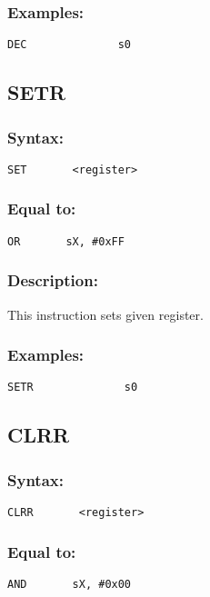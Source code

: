         \subsubsection{Examples:}
            {
                \usecodefont
                \verb'DEC              s0'\\
            }

    \subsection{SETR}
        \subsubsection{Syntax:}
            {
                \usecodefont
                \verb'SET       <register>'
            }

        \subsubsection{Equal to:}
            {
                \usecodefont
                \verb'OR       sX, #0xFF'
            }

        \subsubsection{Description:}
            This instruction sets given register.

        \subsubsection{Examples:}
            {
                \usecodefont
                \verb'SETR              s0'\\
            }

    \subsection{CLRR}
        \subsubsection{Syntax:}
            {
                \usecodefont
                \verb'CLRR       <register>'
            }

        \subsubsection{Equal to:}
            {
                \usecodefont
                \verb'AND       sX, #0x00'
            }

